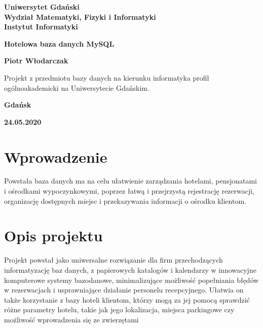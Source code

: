 \documentclass[12pt,a4paper]{article}
\newcommand{\hmwkTitle}{Hotelowa baza danych MySQL} %
\newcommand{\hmwkDueDate}{24.05.2020} %
\newcommand{\hmwkAuthorName}{Piotr Włodarczak} %
\begin{document}
\begin{titlepage}
    \vfill
	\begin{center}
	\hspace*{-1cm}
	\vspace*{0.5cm}
	\textbf{Uniwersytet Gdański \\ [0.05cm]Wydział Matematyki, Fizyki i Informatyki \\ [0.05cm] Instytut Informatyki}

	\vspace{0.6cm}
	\vspace{4cm}
	{\huge \textbf{\hmwkTitle}}\vspace{8mm}
	
	{\large \textbf{\hmwkAuthorName}}\\[3cm]
	
		\hspace{.45\textwidth} %
	   \begin{minipage}{.5\textwidth}
	   Projekt z przedmiotu bazy danych na kierunku informatyka profil ogólnoakademicki na Uniwersytecie Gdańskim.\\[0.1cm]
	  \end{minipage}
	  \vfill
	
	\textbf{Gdańsk}
	
	\textbf{\hmwkDueDate}
	\end{center}
	
\end{titlepage}

\newpage
\setcounter{secnumdepth}{5}
\tableofcontents
\newpage

\section{Wprowadzenie}
\label{sec:introduction}

Powstała baza danych ma na celu ułatwienie zarządzania hotelami, pensjonatami i ośrodkami wypoczynkowymi, poprzez łatwą i przejrzystą rejestrację rezerwacji, organizację dostępnych miejsc i przekazywania informacji o ośrodku klientom. 

\section{Opis projektu}
\label{sec:Project}

Projekt powstał jako uniwersalne rozwiązanie dla firm przechodzących informatyzację baz danych, z papierowych katalogów i kalendarzy w innowacyjne komputerowe systemy bazodanowe, minimalizujące możliwość popełniania błędów w rezerwacjach i usprawniające działanie personelu recepcyjnego. Ułatwia on także korzystanie z bazy hoteli klientom, którzy mogą za jej pomocą sprawdzić różne parametry hotelu, takie jak jego lokalizacja, miejsca parkingowe czy możliwość wprowadzenia się ze zwierzętami
\end{document}
